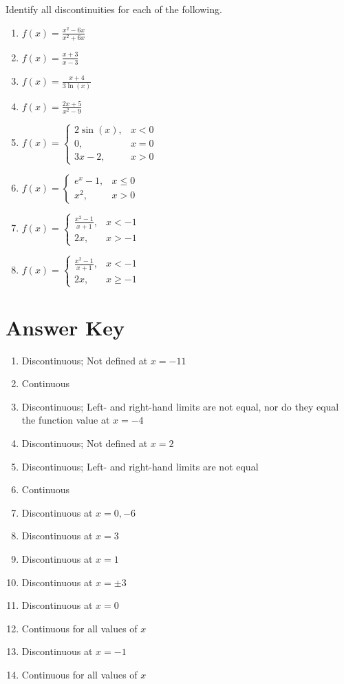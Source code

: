 Identify all discontinuities for each of the following.
\begin{multicols}{2}
\begin{enumerate}		\setcounter{enumi}{\value{Review}}
	\item $f(x) = \frac{x^2-6x}{x^2+6x}$
	\item $f(x) = \frac{x+3}{x-3}$
	\item $f(x) = \frac{x+4}{3\ln(x)}$
	\item $f(x) = \frac{2x+5}{x^2-9}$ \\[1in]
	\item $f(x) = \begin{cases} 
			2 \sin(x), & x < 0 \\
			0, & x = 0 \\
			3x-2, & x > 0	\end{cases}$
	\item $f(x) = \begin{cases}
	e^x - 1, & x \leq 0 \\
	x^2, & x > 0 \end{cases}$
	\item $f(x) = \begin{cases}
		\frac{x^2-1}{x+1}, & x < -1 \\
		2x, & x > -1 \end{cases}$
	\item $f(x) = \begin{cases}
		\frac{x^2-1}{x+1}, & x < -1 \\
		2x, & x \geq -1 \end{cases}$
\end{enumerate}
\end{multicols}

\newpage

\section{Answer Key}

\begin{enumerate}
	\item Discontinuous; Not defined at $x = -11$
	\item Continuous
	\item Discontinuous; Left- and right-hand limits are not equal, nor do they equal the function value at $x = -4$
	\item Discontinuous; Not defined at $x = 2$
	\item Discontinuous; Left- and right-hand limits are not equal
	\item Continuous
	\item Discontinuous at $x = 0, -6$
	\item Discontinuous at $x = 3$
	\item Discontinuous at $x = 1$
	\item Discontinuous at $x = \pm 3$
	\item Discontinuous at $x = 0$
	\item Continuous for all values of $x$
	\item Discontinuous at $x = -1$
	\item Continuous for all values of $x$
\end{enumerate}